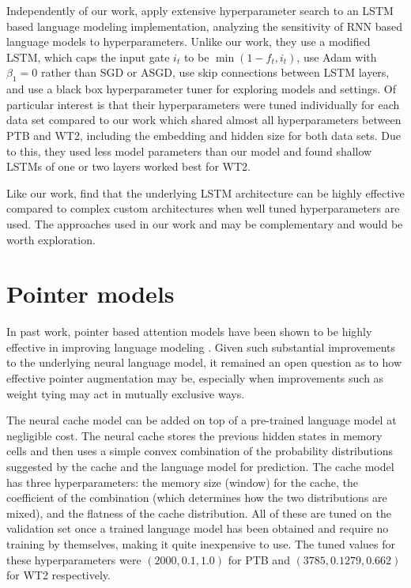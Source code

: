\documentclass{article}
\begin{document}
Independently of our work, \citet{Melis2017} apply extensive hyperparameter search to an LSTM based language modeling implementation, analyzing the sensitivity of RNN based language models to hyperparameters.
Unlike our work, they use a modified LSTM, which caps the input gate $i_t$ to be $\min(1 - f_t, i_t)$, use Adam with $\beta_1=0$ rather than SGD or ASGD, use skip connections between LSTM layers, and use a black box hyperparameter tuner for exploring models and settings.
Of particular interest is that their hyperparameters were tuned individually for each data set compared to our work which shared almost all hyperparameters between PTB and WT2, including the embedding and hidden size for both data sets.
Due to this, they used less model parameters than our model and found shallow LSTMs of one or two layers worked best for WT2.

Like our work, \citet{Melis2017} find that the underlying LSTM architecture can be highly effective compared to complex custom architectures when well tuned hyperparameters are used.
The approaches used in our work and \citet{Melis2017} may be complementary and would be worth exploration.

\section{Pointer models}

In past work, pointer based attention models have been shown to be highly effective in improving language modeling \citep{Merity2016,Grave2016}.
Given such substantial improvements to the underlying neural language model, it remained an open question as to how effective pointer augmentation may be, especially when improvements such as weight tying may act in mutually exclusive ways.

The neural cache model \citep{Grave2016} can be added on top of a pre-trained language model at negligible cost.
The neural cache stores the previous hidden states in memory cells and then uses a simple convex combination of the probability distributions suggested by the cache and the language model for prediction.
The cache model has three hyperparameters: the memory size (window) for the cache, the coefficient of the combination (which determines how the two distributions are mixed), and the flatness of the cache distribution.
All of these are tuned on the validation set once a trained language model has been obtained and require no training by themselves, making it quite inexpensive to use. The tuned values for these hyperparameters were $(2000, 0.1, 1.0)$ for PTB and $(3785, 0.1279, 0.662)$ for WT2 respectively.
\end{document}
